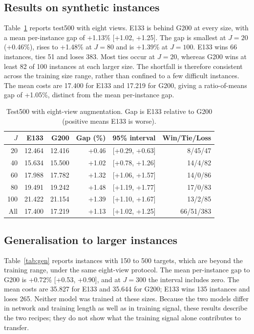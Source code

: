 \documentclass[preprint,12pt,authoryear]{elsarticle}
\begin{document}
\subsection{Results on synthetic instances}
\label{sec:synthetic}

Table~\ref{tab:test500} reports test500 with eight views. E133 is behind G200 at every size, with a mean per-instance gap of +1.13\% [+1.02, +1.25]. The gap is smallest at $J = 20$ (+0.46\%), rises to +1.48\% at $J = 80$ and is +1.39\% at $J = 100$. E133 wins 66 instances, ties 51 and loses 383. Most ties occur at $J = 20$, whereas G200 wins at least 82 of 100 instances at each larger size. The shortfall is therefore consistent across the training size range, rather than confined to a few difficult instances. The mean costs are 17.400 for E133 and 17.219 for G200, giving a ratio-of-means gap of +1.05\%, distinct from the mean per-instance gap.

\begin{table}[t]
\centering
\caption{Test500 with eight-view augmentation. Gap is E133 relative to G200 (positive means E133 is worse).}
\label{tab:test500}
\small
\begin{tabular}{rrrrrr}
\toprule
$J$ & E133 & G200 & Gap (\%) & 95\% interval & Win/Tie/Loss \\
\midrule
20 & 12.464 & 12.416 & +0.46 & [+0.29, +0.63] & 8/45/47 \\
40 & 15.634 & 15.500 & +1.02 & [+0.78, +1.26] & 14/4/82 \\
60 & 17.988 & 17.782 & +1.32 & [+1.06, +1.57] & 14/0/86 \\
80 & 19.491 & 19.242 & +1.48 & [+1.19, +1.77] & 17/0/83 \\
100 & 21.422 & 21.154 & +1.39 & [+1.10, +1.67] & 13/2/85 \\
All & 17.400 & 17.219 & +1.13 & [+1.02, +1.25] & 66/51/383 \\
\bottomrule
\end{tabular}
\end{table}

\subsection{Generalisation to larger instances}

Table~\ref{tab:gen} reports instances with 150 to 500 targets, which are beyond the training range, under the same eight-view protocol. The mean per-instance gap to G200 is +0.72\% [+0.53, +0.90], and at $J = 300$ the interval includes zero. The mean costs are 35.827 for E133 and 35.644 for G200; E133 wins 135 instances and loses 265. Neither model was trained at these sizes. Because the two models differ in network and training length as well as in training signal, these results describe the two recipes; they do not show what the training signal alone contributes to transfer.
\end{document}
